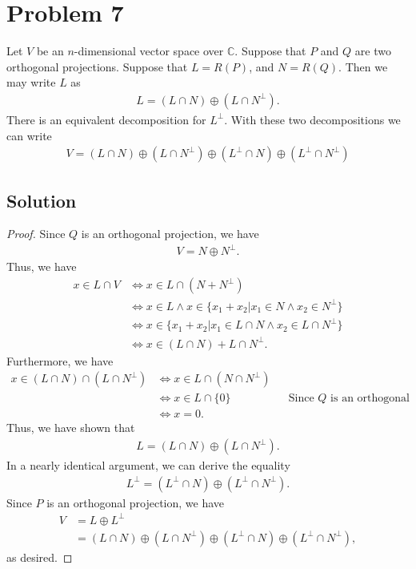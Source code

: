 \documentclass[10pt,a4paper]{article}
\theoremstyle{definition}
\begin{document}
\section*{Problem 7} Let $V$ be an $n$-dimensional vector space over $\mathbb{C}$. Suppose that $P$ and $Q$ are two orthogonal projections. Suppose that $L = R(P)$, and $N = R(Q)$. Then we may write $L$ as
\begin{align*}
L = (L \cap N) \oplus (L \cap N^\perp).
\end{align*}
There is an equivalent decomposition for $L^\perp$. With these two decompositions we can write 
\begin{align*}
V = (L \cap N) \oplus (L \cap N^\perp) \oplus (L^\perp \cap N) \oplus (L^\perp \cap N^\perp)
\end{align*}

\subsection*{Solution}
\begin{proof}
Since $Q$ is an orthogonal projection, we have 
\begin{align*}
V = N \oplus N^\perp.
\end{align*}
Thus, we have 
\begin{align*}
x \in L \cap V &\iff x \in L \cap (N + N^\perp)\\
&\iff x \in L \land x \in \{x_1 + x_2 | x_1 \in N \land x_2 \in N^\perp \}\\
&\iff x \in \{x_1 + x_2 | x_1 \in L \cap N \land x_2 \in L \cap N^\perp \}\\
&\iff x \in  (L \cap N) + L \cap N^\perp.
\end{align*}
Furthermore, we have
\begin{align*}
x \in  (L \cap N) \cap  (L \cap N^\perp) &\iff x \in L \cap (N \cap N^\perp)\\
&\iff x \in L \cap \{0 \}  && \text{Since } Q \text{ is an orthogonal projection}\\
&\iff x = 0.
\end{align*}
Thus, we have shown that 
\begin{align*}
L = (L \cap N) \oplus (L \cap N^\perp).
\end{align*}
In a nearly identical argument, we can derive the equality
\begin{align*}
L^\perp =  (L^\perp \cap N) \oplus (L^\perp \cap N^\perp).
\end{align*}
Since $P$ is an orthogonal projection, we have
\begin{align*}
V &= L \oplus L^\perp\\
&= (L \cap N) \oplus (L \cap N^\perp) \oplus (L^\perp \cap N) \oplus (L^\perp \cap N^\perp),
\end{align*}
as desired.
\end{proof}
\end{document}

